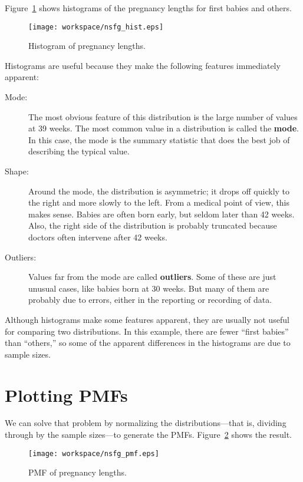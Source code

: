 \documentclass[10pt]{book}
\begin{document}
Figure~\ref{nsfg_hist} shows histograms of the pregnancy lengths for
first babies and others.

\begin{figure}
\centerline{\texttt{[image: workspace/nsfg\_hist.eps]}}
\caption{Histogram of pregnancy lengths.}
\label{nsfg_hist}
\end{figure}

Histograms are useful because they make the following features immediately
apparent:

\begin{description}

\item[Mode:]  The most obvious feature of this distribution is the large
number of values at 39 weeks.  The most common value in a distribution is
called the {\bf mode}.  In this case, the mode is the summary statistic
that does the best job of describing the typical value.

\item[Shape:] Around the mode, the distribution is asymmetric; it drops
off quickly to the right and more slowly to the left.  From a medical
point of view, this makes sense.  Babies are often born early, but
seldom later than 42 weeks.  Also, the right side of the distribution is
probably truncated because doctors often intervene after 42 weeks.

\item[Outliers:] Values far from the mode are called {\bf outliers}.
Some of these are just unusual cases, like babies born at 30 weeks.
But many of them are probably due to errors, either in the reporting
or recording of data.

\end{description}

Although histograms make some features apparent, they are usually not
useful for comparing two distributions.  In this example, there are
fewer ``first babies'' than ``others,'' so some of the apparent
differences in the histograms are due to sample sizes.


\section{Plotting PMFs}

We can solve that problem by normalizing the distributions---that
is, dividing through by the sample sizes---to generate the PMFs.
Figure~\ref{nsfg_pmf} shows the result.

\begin{figure}
\centerline{\texttt{[image: workspace/nsfg\_pmf.eps]}}
\caption{PMF of pregnancy lengths.}
\label{nsfg_pmf}
\end{figure}
\end{document}
